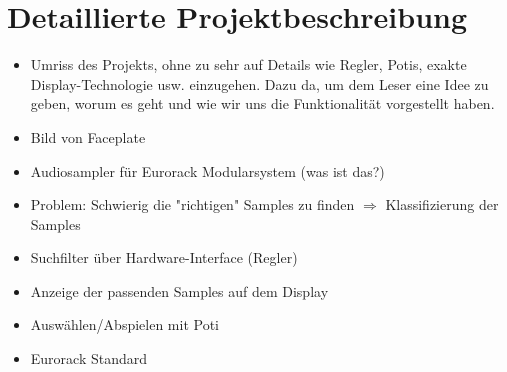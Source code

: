 \newpage
\section{Detaillierte Projektbeschreibung}
\begin{itemize}
    \item Umriss des Projekts, ohne zu sehr auf Details wie Regler, Potis, exakte Display-Technologie usw. einzugehen. Dazu da, um dem Leser eine Idee zu geben, worum es geht und wie wir uns die Funktionalität vorgestellt haben.
    \item Bild von Faceplate
    \item Audiosampler für Eurorack Modularsystem (was ist das?)
    \item Problem: Schwierig die "richtigen" Samples zu finden $\Rightarrow$ Klassifizierung der Samples
    \item Suchfilter über Hardware-Interface (Regler)
    \item Anzeige der passenden Samples auf dem Display
    \item Auswählen/Abspielen mit Poti
    \item Eurorack Standard
\end{itemize}